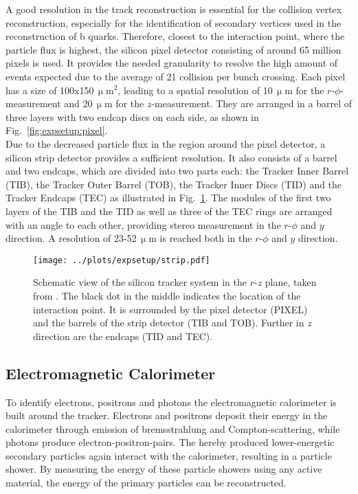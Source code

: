 \noindent A good resolution in the track reconstruction is essential for the collision vertex reconstruction, especially for the identification of secondary vertices used in the reconstruction of b quarks. Therefore, closest to the interaction point, where the particle flux is highest, the silicon pixel detector consisting of around 65 million pixels is used. It provides the needed granularity to resolve the high amount of events expected due to the average of 21 collision per bunch crossing. Each pixel has a size of 100x150\,$\upmu$m$^2$, leading to a spatial resolution of 10\,$\upmu$m for the $r$-$\phi$-measurement and 20\,$\upmu$m for the $z$-measurement. They are arranged in a barrel of three layers with two endcap discs on each side, as shown in Fig.~\ref{fig:expsetup:pixel}.\\

\noindent Due to the decreased particle flux in the region around the pixel detector, a silicon strip detector provides a sufficient resolution. It also consists of a barrel and two endcaps, which are divided into two parts each: the Tracker Inner Barrel (TIB), the Tracker Outer Barrel (TOB), the Tracker Inner Discs (TID) and the Tracker Endcaps (TEC) as illustrated in Fig.~\ref{fig:expsetup:strip}. The modules of the first two layers of the TIB and the TID as well as three of the TEC rings are arranged with an angle to each other, providing stereo measurement in the $r$-$\phi$ and $y$ direction. A resolution of 23-52\,$\upmu$m is reached both in the $r$-$\phi$ and $y$ direction.

\begin{figure}
    \centering
    \texttt{[image: ../plots/expsetup/strip.pdf]}
    \caption[Schematic view of the silicon tracker system]{Schematic view of the silicon tracker system in the $r$-$z$ plane, taken from \cite{strip_fig}. The black dot in the middle indicates the location of the interaction point. It is surrounded by the pixel detector (PIXEL) and the barrels of the strip detector (TIB and TOB). Further in $z$ direction are the endcaps (TID and TEC).}
    \label{fig:expsetup:strip}
\end{figure}

\subsection*{Electromagnetic Calorimeter}
To identify electrons, positrons and photons the electromagnetic calorimeter is built around the tracker. Electrons and positrons deposit their energy in the calorimeter through emission of bremsstrahlung and Compton-scattering, while photons produce electron-positron-pairs. The hereby produced lower-energetic secondary particles again interact with the calorimeter, resulting in a particle shower. By measuring the energy of these particle showers using any active material, the energy of the primary particles can be reconstructed.\\

